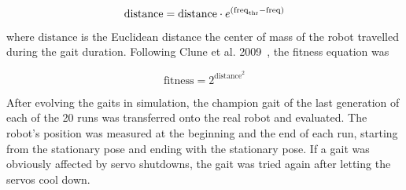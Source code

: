 \begin{equation}
\mathrm{distance} = \mathrm{distance} \cdot e^{(\mathrm{freq}_{\mathrm{thr}}-\mathrm{freq})} \\
\end{equation}

\noindent where \emph{$\mathrm{distance}$} is the Euclidean distance the center of mass of the robot travelled during the gait duration. Following Clune et al. 2009~\cite{clune2009evolving}, the fitness equation was 

\begin{equation}
\mathrm{fitness} = 2^{\mathrm{distance}^{2}}
\end{equation}

After evolving the gaits in simulation, the champion gait of the last generation of each of the 20 runs was transferred onto the real robot and evaluated.
The robot's position was measured at the beginning and the end of each run, starting from the stationary pose and ending with the stationary pose. 
If a gait was obviously affected by servo shutdowns, the gait was tried again after letting the servos cool down. 


